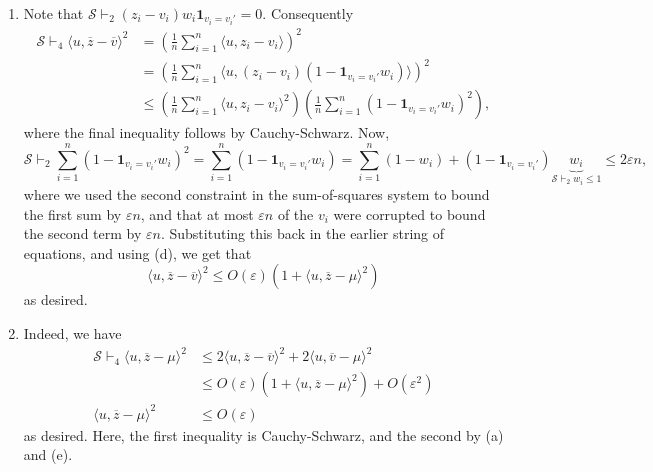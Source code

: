 \documentclass[11pt]{article}
\theoremstyle{definition}
\renewcommand{\epsilon}{\varepsilon}
\newcommand{\indic}{\mathbf{1}}
\begin{document}
\begin{enumerate}[label=(\alph*)]
  \item Note that $\mathcal{S} \vdash_2 (z_i - v_i) w_i \indic_{v_i = v_i'} = 0$. Consequently
  \begin{align*}
    \mathcal{S} \vdash_4 \langle u, \overline{z}-\overline{v}\rangle^2 &= \left( \frac{1}{n} \sum_{i=1}^n \langle u, z_i-v_i\rangle \right)^2 \\
      &= \left( \frac{1}{n} \sum_{i=1}^n \langle u, (z_i - v_i) (1 - \indic_{v_i = v_i'} w_i)\rangle \right)^2 \\
      &\le \left(\frac{1}{n} \sum_{i=1}^n \langle u, z_i-v_i\rangle^2 \right) \left( \frac{1}{n} \sum_{i=1}^n (1 - \indic_{v_i = v_i'} w_i)^2 \right),
  \end{align*}
  where the final inequality follows by Cauchy-Schwarz. Now,
  \[ \mathcal{S} \vdash_2 \sum_{i=1}^n (1 - \indic_{v_i = v_i'} w_i)^2 = \sum_{i=1}^n (1 - \indic_{v_i = v_i'} w_i) = \sum_{i=1}^n (1 - w_i) + (1 - \indic_{v_i=v_i'}) \underbrace{w_i}_{\mathcal{S} \vdash_2 w_i \le 1} \le 2\epsilon n,  \]
  where we used the second constraint in the sum-of-squares system to bound the first sum by $\epsilon n$, and that at most $\epsilon n$ of the $v_i$ were corrupted to bound the second term by $\epsilon n$. Substituting this back in the earlier string of equations, and using (d), we get that
  \[ \langle u, \overline{z} - \overline{v}\rangle^2 \le O(\epsilon) (1 + \langle u, \overline{z}-\mu\rangle^2) \]
  as desired.


  \item Indeed, we have
  \begin{align*}
    \mathcal{S} \vdash_4 \langle u, \overline{z}-\mu\rangle^2 &\le 2 \langle u, \overline{z} - \overline{v}\rangle^2 + 2 \langle u, \overline{v} - \mu\rangle^2 \\
      &\le O(\epsilon) (1 + \langle u, \overline{z} - \mu\rangle^2) + O(\epsilon^2) \\
      \langle u, \overline{z} - \mu\rangle^2 &\le O(\epsilon)
  \end{align*}
  as desired.
  Here, the first inequality is Cauchy-Schwarz, and the second by (a) and (e).\\


\end{enumerate}
\end{document}
